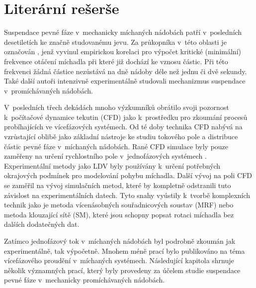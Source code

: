 \chapter{Literární rešerše}
Suspendace pevné fáze v~mechanicky míchaných nádobách patří v~posledních desetiletích ke značně studovanému jevu. Za průkopníka v~této oblasti je označován \citet{zwi58}, jenž vyvinul empirickou korelaci pro výpočet kritické (minimální) frekvence otáčení míchadla při které již dochází ke vznosu částic. Při této frekvenci žádná částice nezůstává na dně nádoby déle než jednu či dvě sekundy. Také další autoři \citep{nie68,bal78,arm98} intenzivně experimentálně studovali mechanizmus suspendace v~promíchávaných nádobách. 

V~posledních třech dekádách mnoho výzkumníků obrátilo svoji pozornost k~po\-čí\-ta\-čo\-vé dynamice tekutin (CFD) jako k~prostředku pro zkoumání procesů probíhajících ve vícefázových systémech. Od té doby technika CFD nabývá na vzrůstající oblibě jako základní nástroje ke studiu tokového pole a distribuce částic pevné fáze v~míchaných nádobách. Rané CFD simulace byly pouze zaměřeny na určení rychlostního pole v~jednofázových systémech \citep{kre91}. Experimentální metody jako LDV byly používány k~určení potřebných okrajových podmínek pro modelování pohybu míchadla. Další vývoj na poli CFD se zaměřil na vývoj simulačních metod, které by kompletně odstranili tuto závislost na experimentálních datech. Tyto snahy vyústily k~tvorbě komplexních technik jako je metoda vícenásobných souřadnicových soustav (MRF) nebo metoda klouzající sítě (SM), které jsou schopny popsat rotaci míchadla bez dalších dodatečných dat.  

Zatímco jednofázový tok v~míchaných nádobách byl podrobně zkoumán jak experimentálně, tak výpočetně. Mnohem méně prací bylo publikováno na téma vícefázového proudění v~míchaných systémech. Následující kapitola shrnuje několik významných prací, který byly provedeny za účelem studie suspendace pevné fáze v~mechanicky promíchávaných nádobách.
  
